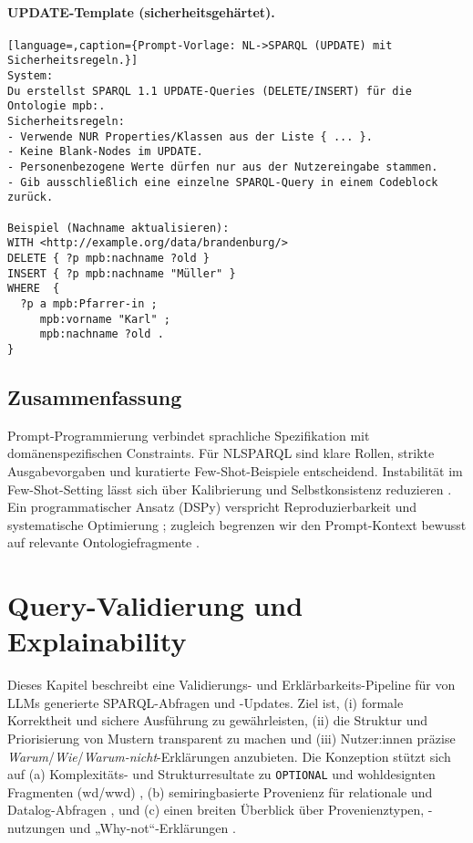 \paragraph{UPDATE-Template (sicherheitsgehärtet).}
\begin{lstlisting}[language=,caption={Prompt-Vorlage: NL->SPARQL (UPDATE) mit Sicherheitsregeln.}]
System:
Du erstellst SPARQL 1.1 UPDATE-Queries (DELETE/INSERT) für die Ontologie mpb:.
Sicherheitsregeln:
- Verwende NUR Properties/Klassen aus der Liste { ... }.
- Keine Blank-Nodes im UPDATE.
- Personenbezogene Werte dürfen nur aus der Nutzereingabe stammen.
- Gib ausschließlich eine einzelne SPARQL-Query in einem Codeblock zurück.

Beispiel (Nachname aktualisieren):
WITH <http://example.org/data/brandenburg/>
DELETE { ?p mpb:nachname ?old }
INSERT { ?p mpb:nachname "Müller" }
WHERE  {
  ?p a mpb:Pfarrer-in ;
     mpb:vorname "Karl" ;
     mpb:nachname ?old .
}
\end{lstlisting}

\subsection{Zusammenfassung}
Prompt-Programmierung verbindet sprachliche Spezifikation mit domänenspezifischen Constraints. Für NL{\textrightarrow}SPARQL sind klare Rollen, strikte Ausgabevorgaben und kuratierte Few-Shot-Beispiele entscheidend. Instabilität im Few-Shot-Setting lässt sich über Kalibrierung und Selbstkonsistenz reduzieren \cite{zhao2021calibrate,wang2023selfconsistency}. Ein programmatischer Ansatz (DSPy) verspricht Reproduzierbarkeit und systematische Optimierung \cite{khattab2023dspy}; zugleich begrenzen wir den Prompt-Kontext bewusst auf relevante Ontologiefragmente \cite{avila2024text2sparql}.



\section{Query-Validierung und Explainability}
\label{sec:Query-Validierung-Explainability}

Dieses Kapitel beschreibt eine Validierungs- und Erklärbarkeits-Pipeline für von LLMs generierte SPARQL-Abfragen und -Updates. Ziel ist, (i) formale Korrektheit und sichere Ausführung zu gewährleisten, (ii) die Struktur und Priorisierung von Mustern transparent zu machen und (iii) Nutzer:innen präzise \emph{Warum}/\emph{Wie}/\emph{Warum-nicht}-Erklärungen anzubieten. Die Konzeption stützt sich auf (a) Komplexitäts- und Strukturresultate zu \texttt{OPTIONAL} und wohldesignten Fragmenten (wd/wwd) \cite{perez2009sparql,kaminski2016beyond}, (b) semiringbasierte Provenienz für relationale und Datalog-Abfragen \cite{green2007provenance}, und (c) einen breiten Überblick über Provenienztypen, -nutzungen und „Why-not“-Erklärungen \cite{herschel2017survey}.



